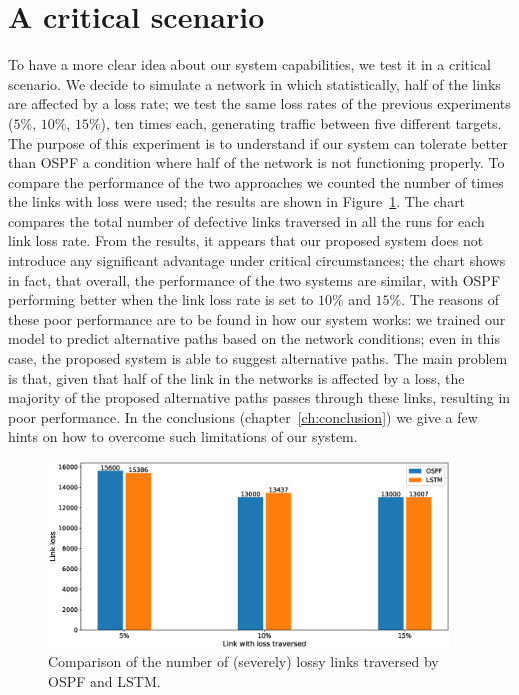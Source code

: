 \section{A critical scenario}
To have a more clear idea about our system capabilities, we test it in a critical scenario. We decide to simulate a network in which statistically, half of the links are affected by a loss rate; we test the same loss rates of the previous experiments ($5\%$, $10\%$, $15\%$), ten times each, generating traffic between five different targets. The purpose of this experiment is to understand if our system can tolerate better than OSPF a condition where half of the network is not functioning properly. To compare the performance of the two approaches we counted the number of times the links with loss were used; the results are shown in Figure~\ref{fig:stress_test}. The chart compares the total number of defective links traversed in all the runs for each link loss rate. From the results, it appears that our proposed system does not introduce any significant advantage under critical circumstances; the chart shows in fact, that overall, the performance of the two systems are similar, with OSPF performing better when the link loss rate is set to $10\%$ and $15\%$. The reasons of these poor performance are to be found in how our system works: we trained our model to predict alternative paths based on the network conditions; even in this case, the proposed system is able to suggest alternative paths. The main problem is that, given that half of the link in the networks is affected by a loss, the majority of the proposed alternative paths passes through these links, resulting in poor performance. In the conclusions (chapter~\ref{ch:conclusion}) we give a few hints on how to overcome such limitations of our system.

\begin{figure}
\centering
\includegraphics[width=0.949\textwidth]{img/stress_test}
\caption{Comparison of the number of (severely) lossy links traversed by OSPF and LSTM.}
\label{fig:stress_test}
\end{figure}

